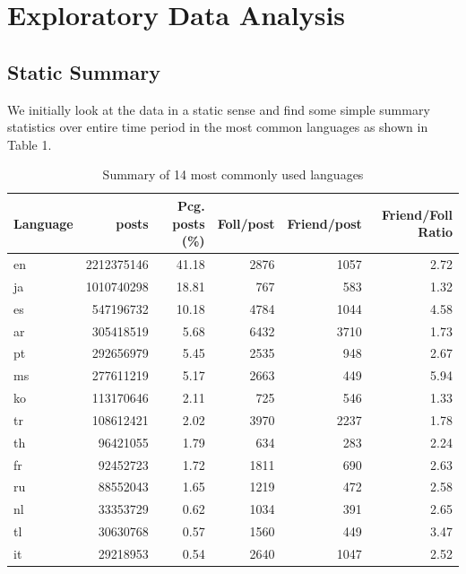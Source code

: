 \documentclass[12pt]{article}
\begin{document}
\section{Exploratory Data Analysis}
\subsection{Static Summary}
We initially look at the data in a static sense and find some simple summary statistics over entire time period in the most common languages as shown in Table 1.
\FloatBarrier
\begin{table}[htbp]
\begin{center}
\caption{Summary of 14 most commonly used languages}
\begin{tabular}{lrrrrr}
\toprule
Language & posts &  Pcg. posts (\%) & Foll/post   & Friend/post &  Friend/Foll Ratio  \\
\midrule
en   &  2212375146 &       41.18 &     2876 &       1057 &               2.72 \\
ja   &  1010740298 &       18.81 &      767 &        583 &               1.32 \\
es   &   547196732 &       10.18 &     4784 &       1044 &               4.58 \\
ar   &   305418519 &        5.68 &     6432 &       3710 &               1.73 \\
pt   &   292656979 &        5.45 &     2535 &        948 &               2.67 \\
ms   &   277611219 &        5.17 &     2663 &        449 &               5.94 \\
ko   &   113170646 &        2.11 &      725 &        546 &               1.33 \\
tr   &   108612421 &        2.02 &     3970 &       2237 &               1.78 \\
th   &    96421055 &        1.79 &      634 &        283 &               2.24 \\
fr   &    92452723 &        1.72 &     1811 &        690 &               2.63 \\
ru   &    88552043 &        1.65 &     1219 &        472 &               2.58 \\
nl   &    33353729 &        0.62 &     1034 &        391 &               2.65 \\
tl   &    30630768 &        0.57 &     1560 &        449 &               3.47 \\
it   &    29218953 &        0.54 &     2640 &       1047 &               2.52 \\
\bottomrule
\bottomrule
\end{tabular}
\end{center}
\end{table}
\end{document}
